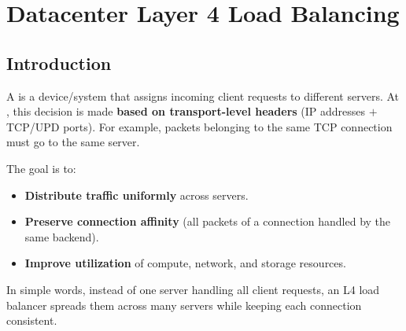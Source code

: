\section{Datacenter Layer 4 Load Balancing}

\subsection{Introduction}

A  is a device/system that assigns incoming client requests to different servers. At , this decision is made \textbf{based on transport-level headers} (IP addresses $+$ TCP/UPD ports). For example, packets belonging to the same TCP connection must go to the same server.

\highspace
The goal is to:
\begin{itemize}
    \item \textbf{Distribute traffic uniformly} across servers.
    \item \textbf{Preserve connection affinity} (all packets of a connection handled by the same backend).
    \item \textbf{Improve utilization} of compute, network, and storage resources.
\end{itemize}
In simple words, instead of one server handling all client requests, an L4 load balancer spreads them across many servers while keeping each connection consistent.

